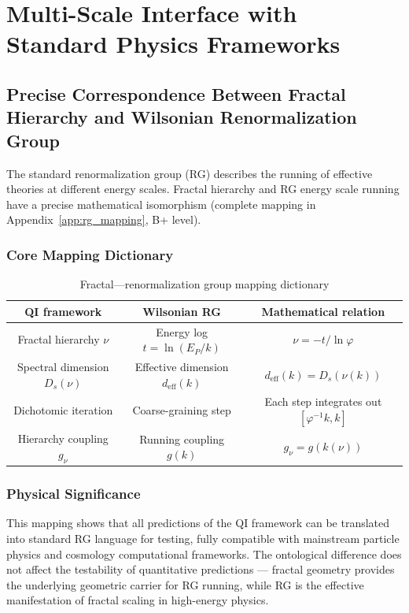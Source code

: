 \documentclass[12pt,a4paper,twocolumn]{article}
\renewcommand{\phi}{\varphi}
\begin{document}
\section{Multi-Scale Interface with Standard Physics Frameworks}

\subsection{Precise Correspondence Between Fractal Hierarchy and Wilsonian Renormalization Group}
The standard renormalization group (RG) describes the running of effective theories at different energy scales. Fractal hierarchy and RG energy scale running have a precise mathematical isomorphism (complete mapping in Appendix~\ref{app:rg_mapping}, B+ level).

\subsubsection{Core Mapping Dictionary}
\begin{table}[H]
\centering
\footnotesize
\caption{Fractal---renormalization group mapping dictionary}
\begin{tabular}{c|c|c}
\hline
\textbf{QI framework} & \textbf{Wilsonian RG} & \textbf{Mathematical relation} \\
\hline
Fractal hierarchy $\nu$ & Energy log $t=\ln(E_P/k)$ & $\nu = -t/\ln\phi$ \\
Spectral dimension $D_s(\nu)$ & Effective dimension $d_{\text{eff}}(k)$ & $d_{\text{eff}}(k) = D_s(\nu(k))$ \\
Dichotomic iteration & Coarse-graining step & Each step integrates out $[\phi^{-1}k,k]$ \\
Hierarchy coupling $g_\nu$ & Running coupling $g(k)$ & $g_\nu = g(k(\nu))$ \\
\hline
\end{tabular}
\end{table}

\subsubsection{Physical Significance}
This mapping shows that all predictions of the QI framework can be translated into standard RG language for testing, fully compatible with mainstream particle physics and cosmology computational frameworks. The ontological difference does not affect the testability of quantitative predictions --- fractal geometry provides the underlying geometric carrier for RG running, while RG is the effective manifestation of fractal scaling in high-energy physics.
\end{document}
